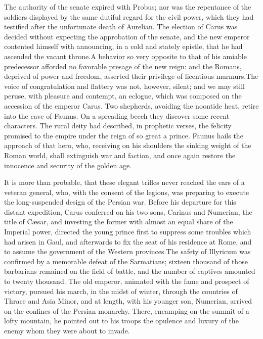 The authority of the senate expired with Probus; nor was the
repentance of the soldiers displayed by the same dutiful regard
for the civil power, which they had testified after the
unfortunate death of Aurelian. The election of Carus was decided
without expecting the approbation of the senate, and the new
emperor contented himself with announcing, in a cold and stately
epistle, that he had ascended the vacant throne.\footnotemark[68] A behavior so
very opposite to that of his amiable predecessor afforded no
favorable presage of the new reign: and the Romans, deprived of
power and freedom, asserted their privilege of licentious
murmurs.\footnotemark[69] The voice of congratulation and flattery was not,
however, silent; and we may still peruse, with pleasure and
contempt, an eclogue, which was composed on the accession of the
emperor Carus. Two shepherds, avoiding the noontide heat, retire
into the cave of Faunus. On a spreading beech they discover some
recent characters. The rural deity had described, in prophetic
verses, the felicity promised to the empire under the reign of so
great a prince. Faunus hails the approach of that hero, who,
receiving on his shoulders the sinking weight of the Roman world,
shall extinguish war and faction, and once again restore the
innocence and security of the golden age.\footnotemark[70]




It is more than probable, that these elegant trifles never
reached the ears of a veteran general, who, with the consent of
the legions, was preparing to execute the long-suspended design
of the Persian war. Before his departure for this distant
expedition, Carus conferred on his two sons, Carinus and
Numerian, the title of Cæsar, and investing the former with
almost an equal share of the Imperial power, directed the young
prince first to suppress some troubles which had arisen in Gaul,
and afterwards to fix the seat of his residence at Rome, and to
assume the government of the Western provinces.\footnotemark[71] The safety of
Illyricum was confirmed by a memorable defeat of the Sarmatians;
sixteen thousand of those barbarians remained on the field of
battle, and the number of captives amounted to twenty thousand.
The old emperor, animated with the fame and prospect of victory,
pursued his march, in the midst of winter, through the countries
of Thrace and Asia Minor, and at length, with his younger son,
Numerian, arrived on the confines of the Persian monarchy. There,
encamping on the summit of a lofty mountain, he pointed out to
his troops the opulence and luxury of the enemy whom they were
about to invade.


